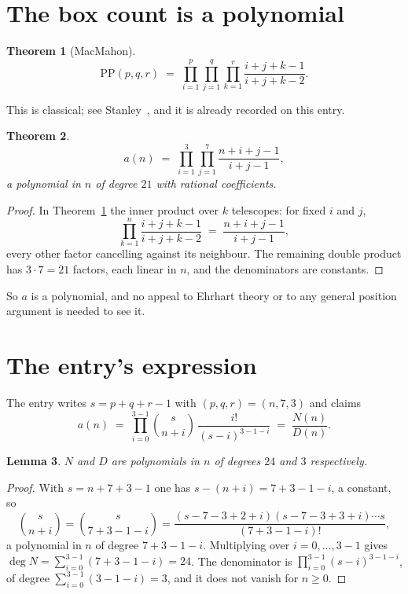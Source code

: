 \documentclass[11pt,a4paper]{article}
\theoremstyle{plain}
\newtheorem{theorem}{Theorem}
\newtheorem{lemma}[theorem]{Lemma}
\theoremstyle{definition}
\begin{document}
\section{The box count is a polynomial}

\begin{theorem}[MacMahon]\label{thm:mm}
\[
\mathrm{PP}(p,q,r)\;=\;\prod_{i=1}^{p}\prod_{j=1}^{q}\prod_{k=1}^{r}
\frac{i+j+k-1}{i+j+k-2} .
\]
\end{theorem}

This is classical; see Stanley~\cite{stanley}, and it is already recorded on this entry.

\begin{theorem}\label{thm:poly}
\[
a(n)\;=\;\prod_{i=1}^{3}\prod_{j=1}^{7}\frac{n+i+j-1}{i+j-1},
\]
a polynomial in $n$ of degree $21$ with rational coefficients.
\end{theorem}

\begin{proof}
In Theorem~\ref{thm:mm} the inner product over $k$ telescopes: for fixed $i$ and $j$,
\[
\prod_{k=1}^{n}\frac{i+j+k-1}{i+j+k-2}\;=\;\frac{n+i+j-1}{i+j-1} ,
\]
every other factor cancelling against its neighbour. The remaining double product has
$3\cdot7=21$ factors, each linear in $n$, and the denominators are constants.
\end{proof}

So $a$ is a polynomial, and no appeal to Ehrhart theory or to any general position argument is
needed to see it.

\section{The entry's expression}

The entry writes $s=p+q+r-1$ with $(p,q,r)=(n,7,3)$ and claims
\[
a(n)\;=\;\prod_{i=0}^{3-1}\binom{s}{n+i}\,\frac{i!}{(s-i)^{3-1-i}}\;=\;
\frac{N(n)}{D(n)} .
\]

\begin{lemma}\label{lem:deg}
$N$ and $D$ are polynomials in $n$ of degrees $24$ and $3$ respectively.
\end{lemma}

\begin{proof}
With $s=n+7+3-1$ one has $s-(n+i)=7+3-1-i$, a constant, so
\[
\binom{s}{n+i}=\binom{s}{7+3-1-i}
=\frac{(s-7-3+2+i)(s-7-3+3+i)\cdots s}{(7+3-1-i)!},
\]
a polynomial in $n$ of degree $7+3-1-i$. Multiplying over $i=0,\dots,3-1$ gives
$\deg N=\sum_{i=0}^{3-1}(7+3-1-i)=24$. The denominator is
$\prod_{i=0}^{3-1}(s-i)^{3-1-i}$, of degree
$\sum_{i=0}^{3-1}(3-1-i)=3$, and it does not vanish for $n\ge0$.
\end{proof}
\end{document}
